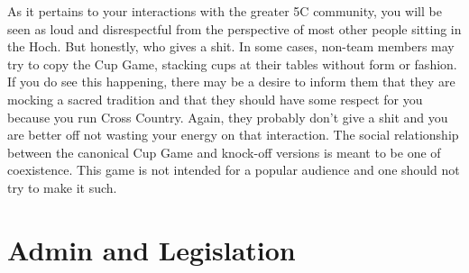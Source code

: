 \documentclass[12pt]{IEEEconf}
\begin{document}
As it pertains to your interactions with the greater 5C community, you will be seen as loud and disrespectful from the perspective of most other people sitting in the Hoch. But honestly, who gives a shit. In some cases, non-team members may try to copy the Cup Game, stacking cups at their tables without form or fashion. If you do see this happening, there may be a desire to inform them that they are mocking a sacred tradition and that they should have some respect for you because you run Cross Country. Again, they probably don't give a shit and you are better off not wasting your energy on that interaction. The social relationship between the canonical Cup Game and knock-off versions is meant to be one of coexistence. This game is not intended for a popular audience and one should not try to make it such.

\section{Admin and Legislation}
\end{document}
